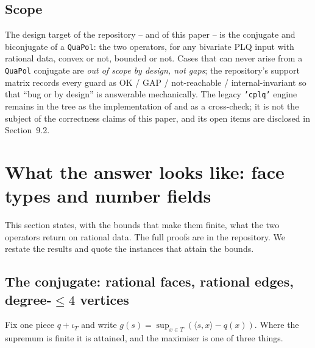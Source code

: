 \documentclass[11pt]{article}
\theoremstyle{definition}
\begin{document}
\subsection{Scope}

The design target of the repository -- and of this paper -- is the conjugate
and biconjugate of a \texttt{QuaPol}: the two operators, for any bivariate PLQ
input with rational data, convex or not, bounded or not.
 Cases that can
never arise from a \texttt{QuaPol} conjugate are \emph{out of scope by design,
not gaps}; the repository's support matrix records every guard as OK / GAP /
not-reachable / internal-invariant so that ``bug or by design'' is answerable
mechanically.
The legacy \texttt{'cplq'} engine remains in the tree as the implementation of
\citet{KARMARKAR-25,KARMARKAR-25a} and as a cross-check; it is not the subject
of the correctness claims of this paper, and its open items are disclosed in
Section~9.2.

\section{What the answer looks like: face types and number fields}

This section states, with the bounds that make them finite, what the two
operators return on rational data. The full proofs are in the repository.
 We restate the results and quote
the instances that attain the bounds.

\subsection{The conjugate: rational faces, rational edges, degree-$\le 4$ vertices}

Fix one piece $q+\iota_{T}$ and write
$g(s) = \sup_{x\in T}(\langle s,x\rangle - q(x))$. Where the supremum is
finite it is attained, and the maximiser is one of three
things.
\end{document}
